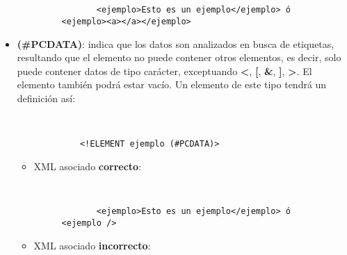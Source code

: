 \begin{itemize}
\begin{itemize}
     \begin{figure}[h]
        \begin{tcolorbox}[sharp corners, colback=yellow!30, colframe=white!20]
            \scriptsize
            \begin{verbatim}


       <ejemplo>Esto es un ejemplo</ejemplo> ó <ejemplo><a></a></ejemplo>
            \end{verbatim}
        \end{tcolorbox}
     \end{figure}
    \end{itemize}

    \item \textbf{(\#PCDATA)}: indica que los datos son analizados en busca de etiquetas, resultando que el elemento no puede contener otros elementos, es decir, solo puede contener datos de tipo carácter, exceptuando \textbf{<}, \textbf{[}, \textbf{\&}, \textbf{]}, \textbf{>}. El elemento también podrá estar vacío. Un elemento de este tipo tendrá un definición así:

    \begin{figure}[H]
        \begin{tcolorbox}[sharp corners, colback=yellow!30, colframe=white!20]
            \scriptsize
            \begin{verbatim}


       <!ELEMENT ejemplo (#PCDATA)>
            \end{verbatim}
        \end{tcolorbox}
    \end{figure}

    \begin{itemize}
        \item XML asociado \textbf{correcto}:

        \begin{figure}[H]
            \begin{tcolorbox}[sharp corners, colback=yellow!30, colframe=white!20]
                \scriptsize
                \begin{verbatim}


       <ejemplo>Esto es un ejemplo</ejemplo> ó <ejemplo />
                \end{verbatim}
            \end{tcolorbox}
        \end{figure}

        \item XML asociado \textbf{incorrecto}:


\end{itemize}
\end{itemize}
